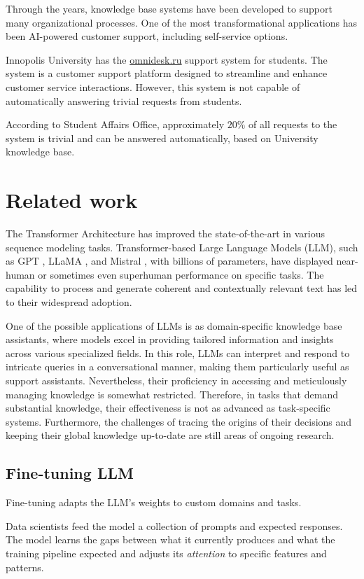 \documentclass[conference, 11pt]{IEEEtran}
\begin{document}
Through the years, knowledge base systems have been developed to support many organizational processes. One of the most transformational applications has been AI-powered customer support, including self-service options.

Innopolis University has the \href{http://omnidesk.ru}{omnidesk.ru} support system for students. The system is a customer support platform designed to streamline and enhance customer service interactions. However, this system is not capable of automatically answering trivial requests from students.

According to Student Affairs Office, approximately $20\%$ of all requests to the system is trivial and can be answered automatically, based on University knowledge base.

\section{Related work}
The Transformer Architecture \cite{attention_is_all_you_need} has improved the state-of-the-art in various sequence modeling tasks. Transformer-based Large Language Models (LLM), such as GPT \cite{gpt}, LLaMA \cite{llama}, and Mistral \cite{mistral}, with billions of parameters, have displayed near-human or sometimes even superhuman performance on specific tasks. The capability to process and generate coherent and contextually relevant text has led to their widespread adoption.

One of the possible applications of LLMs is as domain-specific knowledge base assistants, where models excel in providing tailored information and insights across various specialized fields. In this role, LLMs can interpret and respond to intricate queries in a conversational manner, making them particularly useful as support assistants. Nevertheless, their proficiency in accessing and meticulously managing knowledge is somewhat restricted. Therefore, in tasks that demand substantial knowledge, their effectiveness is not as advanced as task-specific systems. Furthermore, the challenges of tracing the origins of their decisions and keeping their global knowledge up-to-date are still areas of ongoing research.

\subsection{Fine-tuning LLM}
Fine-tuning adapts the LLM's weights to custom domains and tasks.

Data scientists feed the model a collection of prompts and expected responses. The model learns the gaps between what it currently produces and what the training pipeline expected and adjusts its \emph{attention} to specific features and patterns.
\end{document}
